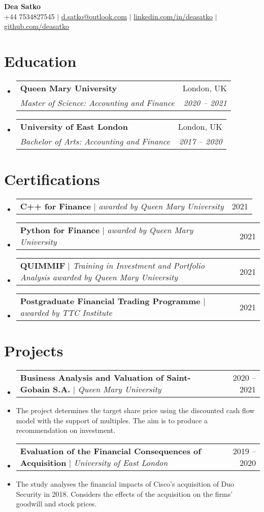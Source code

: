\documentclass[letterpaper,11pt]{article}
\makeatletter
\newcommand{\resumeText}[1]{
  \item\small{
    {#1 \vspace{-2pt}}
  }
}
\newcommand{\resumeSubheading}[4]{
  \vspace{-2pt}\item
    \begin{tabular*}{0.97\textwidth}[t]{l@{\extracolsep{\fill}}r}
      \textbf{#1} & #2 \\
      \textit{\small#3} & \textit{\small #4} \\
    \end{tabular*}\vspace{-7pt}
}
\newcommand{\resumeProjectHeading}[2]{
    \item
    \begin{tabular*}{0.97\textwidth}{l@{\extracolsep{\fill}}r}
      \small#1 & #2 \\
    \end{tabular*}\vspace{-7pt}
}
\newcommand{\resumeSubHeadingListStart}{\begin{itemize}[leftmargin=0.15in, label={}]}
\newcommand{\resumeSubHeadingListEnd}{\end{itemize}}
\makeatother
\begin{document}
\begin{center}
    \textbf{\Huge Dea Satko} \\ \vspace{1pt}
    \small +44 7534827545 $|$ \href{mailto:d.satko@outlook.com}{{d.satko@outlook.com}} $|$ 
    \href{https://www.linkedin.com/in/deasatko/}{{linkedin.com/in/deasatko}} $|$
    \href{https://github.com/deasatko/}{{github.com/deasatko}}
\end{center}


\section{Education}
  \resumeSubHeadingListStart
    \resumeSubheading
      {Queen Mary University}{London, UK}
      {Master of Science: Accounting and Finance}{2020 -- 2021}
    \resumeSubheading
      {University of East London}{London, UK}
      {Bachelor of Arts: Accounting and Finance}{2017 -- 2020}
  \resumeSubHeadingListEnd

\section{Certifications}
  \resumeSubHeadingListStart
    \resumeProjectHeading
      {\textbf{C++ for Finance} $|$ \emph{awarded by Queen Mary University}}{2021}
    \resumeProjectHeading
      {\textbf{Python for Finance} $|$ \emph{awarded by Queen Mary University}}{2021}
    \resumeProjectHeading
      {\textbf{QUIMMIF} $|$ \emph{Training in Investment and Portfolio Analysis awarded by Queen Mary University}}{2021}
    \resumeProjectHeading
      {\textbf{Postgraduate Financial Trading Programme} $|$ \emph{awarded by TTC Institute}}{2021}
\resumeSubHeadingListEnd

\section{Projects}
    \resumeSubHeadingListStart
      \resumeProjectHeading
        {\textbf{\href{https://github.com/deasatko/University/tree/main/Masters/Dissertation}{\faGithub} Business Analysis and Valuation of Saint-Gobain S.A.} $|$ \emph{Queen Mary University}}{2020 -- 2021}
        \resumeText{The project determines the target share price using the discounted cash flow model with the support of multiples. The aim is to produce a recommendation on investment.} 
      \resumeProjectHeading
      {\textbf{\href{https://github.com/deasatko/University/tree/main/Bachelors/Dissertation}{\faGithub} Evaluation of the Financial Consequences of Acquisition} $|$ \emph{University of East London}}{2019 -- 2020}
      \resumeText{The study analyses the financial impacts of Cisco’s acquisition of Duo Security in 2018. Considers the effects of the acquisition on the firms’ goodwill and stock prices.} 
    \resumeSubHeadingListEnd
\end{document}
